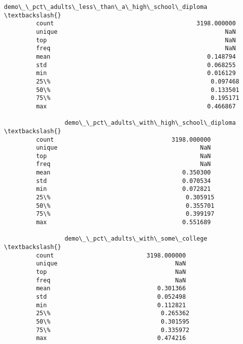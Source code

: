 \documentclass[11pt]{article}
\begin{document}
\begin{Verbatim}[commandchars=\\\{\}]
                 demo\_\_pct\_adults\_less\_than\_a\_high\_school\_diploma  \textbackslash{}
         count                                        3198.000000   
         unique                                               NaN   
         top                                                  NaN   
         freq                                                 NaN   
         mean                                            0.148794   
         std                                             0.068255   
         min                                             0.016129   
         25\%                                             0.097468   
         50\%                                             0.133501   
         75\%                                             0.195171   
         max                                             0.466867   
         
                 demo\_\_pct\_adults\_with\_high\_school\_diploma  \textbackslash{}
         count                                 3198.000000   
         unique                                        NaN   
         top                                           NaN   
         freq                                          NaN   
         mean                                     0.350300   
         std                                      0.070534   
         min                                      0.072821   
         25\%                                      0.305915   
         50\%                                      0.355701   
         75\%                                      0.399197   
         max                                      0.551689   
         
                 demo\_\_pct\_adults\_with\_some\_college  \textbackslash{}
         count                          3198.000000   
         unique                                 NaN   
         top                                    NaN   
         freq                                   NaN   
         mean                              0.301366   
         std                               0.052498   
         min                               0.112821   
         25\%                               0.265362   
         50\%                               0.301595   
         75\%                               0.335972   
         max                               0.474216   
         

\end{Verbatim}
\end{document}
